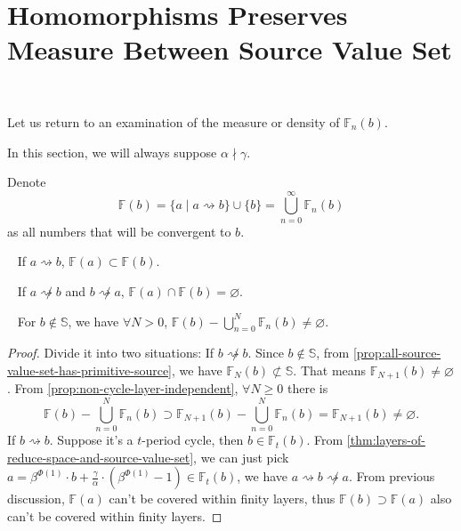 \section{Homomorphisms Preserves Measure Between Source Value Set}~\label{sec:homomorphisms-preserves-measure-between-source-value-set}

Let us return to an examination of the measure or density of $\mathbb{F}_{n}(b)$.

In this section, we will always suppose $\alpha \nmid \gamma$.

\begin{definition}
Denote
\[\mathbb{F}(b) = \{ a \mid a\rightsquigarrow b \}\cup\{b\} = \bigcup_{n = 0}^{\infty}\mathbb{F}_{n}(b)\]
as all numbers that will be convergent to $b$.
\end{definition}
\begin{proposition}~\label{prop:source-set-include}
	If $a\rightsquigarrow b$, $\mathbb{F}(a) \subset \mathbb{F}(b)$.
\end{proposition}
\begin{proposition}~\label{prop:source-set-disjoint}
	If $a \not\rightsquigarrow b$ and $b \not\rightsquigarrow a$, $\mathbb{F}(a) \cap \mathbb{F}(b) = \varnothing$.
\end{proposition}
\begin{theorem}~\label{thm:infinite-layers}
	For $b\not\in\mathbb{S}$, we have $\forall N > 0$, $\mathbb{F}(b) - \bigcup_{n=0}^{N}\mathbb{F}_{n}(b) \ne \varnothing$.
\end{theorem}
\begin{proof}
	Divide it into two situations:\newline
	If $b \not\rightsquigarrow b$. Since $b\not\in\mathbb{S}$, from \cref{prop:all-source-value-set-has-primitive-source}, we have $\mathbb{F}_{N}(b) \not\subset \mathbb{S}$. That means $\mathbb{F}_{N + 1}(b) \ne \varnothing$.
	From \cref{prop:non-cycle-layer-independent}, $\forall N \ge 0$ there is
	\[\mathbb{F}(b) - \bigcup_{n=0}^{N}\mathbb{F}_{n}(b) \supset \mathbb{F}_{N+1}(b) - \bigcup_{n=0}^{N}\mathbb{F}_{n}(b) = \mathbb{F}_{N+1}(b) \ne \varnothing.\]
	If $b \rightsquigarrow b$. Suppose it's a $t$-period cycle, then $b \in\mathbb{F}_{t}(b)$. From \cref{thm:layers-of-reduce-space-and-source-value-set}, we can just pick $a = \beta^{\Phi(1)}\cdot b + \frac{\gamma}{\alpha}\cdot(\beta^{\Phi(1)} - 1)\in\mathbb{F}_{t}(b)$, we have $a \rightsquigarrow b \not\rightsquigarrow a$. From previous discussion, $\mathbb{F}(a)$ can't be covered within finity layers, thus $\mathbb{F}(b) \supset \mathbb{F}(a)$ also can't be covered within finity layers.
\end{proof}

